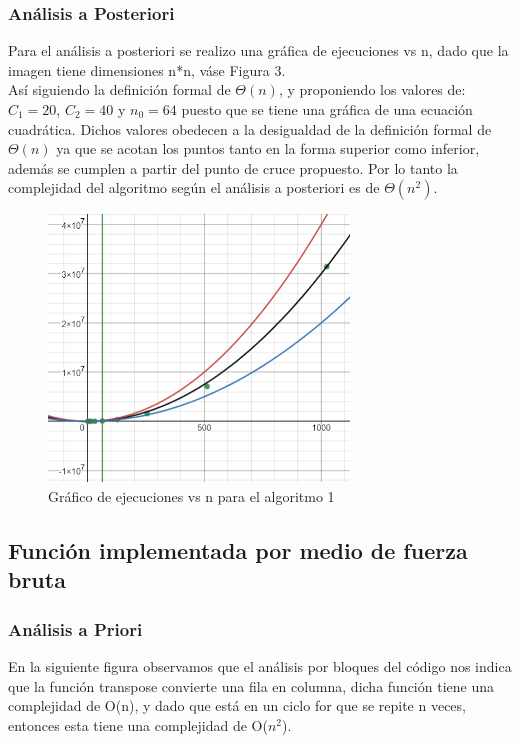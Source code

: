 \documentclass[12pt,twoside]{article}
\begin{document}
        \subsubsection{An\'alisis a Posteriori}
        
        Para el análisis a posteriori se realizo una gráfica de ejecuciones vs n, dado que la imagen tiene dimensiones n*n, v\'ase Figura 3.
        \\
        As\'i siguiendo la definición formal de $\Theta(n)$, y proponiendo los valores de: $C_{1}=20$, $C_{2}=40$ y $n_{0}=64$ puesto que se tiene una gráfica de una ecuación cuadrática. Dichos valores obedecen a la desigualdad de la definición formal de $\Theta(n)$ ya que se acotan los puntos tanto en la forma superior como inferior, además se cumplen a partir del punto de cruce propuesto. 
        Por lo tanto la complejidad del algoritmo según el análisis a posteriori es de $\Theta(n^2)$.
        \\
        \begin{figure}[H]
        \centering
        \includegraphics[width=8cm]{imagenes/g1.png}
        \caption{Gráfico de ejecuciones vs n para el algoritmo 1}
        \end{figure}
        
    \subsection{Funci\'on implementada por medio de fuerza bruta}
        \subsubsection{An\'alisis a Priori}
        En la siguiente figura observamos que el análisis por bloques del código nos indica que la función transpose convierte una fila en columna, dicha función tiene una complejidad de O(n), y dado que está en un ciclo for que se repite n veces, entonces esta tiene una complejidad de O($n^2$).
        
\end{document}
